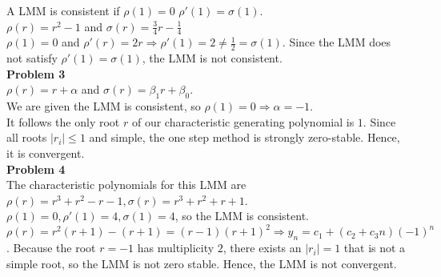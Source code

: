 \documentclass[10pt]{article}
\begin{document}
A LMM is consistent if $\rho(1)=0$ $\rho'(1)=\sigma(1)$.\\
$\rho(r)=r^2-1$ and $\sigma(r)=\frac{3}{4}r-\frac{1}{4}$\\
$\rho(1)=0$ and $\rho'(r)=2r\Rightarrow \rho'(1)=2\neq\frac{1}{2}=\sigma(1)$.
Since the LMM does not satisfy $\rho'(1)=\sigma(1)$, the LMM is not consistent. \\
\textbf{Problem 3}\\
$\rho(r)=r+\alpha$ and $\sigma(r)=\beta_1 r+\beta_0$.\\
We are given the LMM is consistent, so $\rho(1)=0\Rightarrow \alpha=-1$.\\
It follows the only root $r$ of our characteristic generating polynomial is $1$. 
Since all roots $|r_i|\le 1$ and simple, the one step method is strongly zero-stable.
Hence, it is convergent.\\
\textbf{Problem 4}\\
The characteristic polynomials for this LMM are $\rho(r)=r^3+r^2-r-1,\sigma(r)=r^3+r^2+r+1$.\\
$\rho(1)=0,\rho'(1)=4,\sigma(1)=4$, so the LMM is consistent.\\
$\rho(r)=r^2(r+1)-(r+1)=(r-1){(r+1)}^2\Rightarrow y_n=c_1+(c_2+c_3n){(-1)}^n$. 
Because the root $r=-1$ has multiplicity $2$, there exists an $|r_i|=1$ that is not a simple root, so the LMM is not zero stable.
Hence, the LMM is not convergent.
\end{document}
